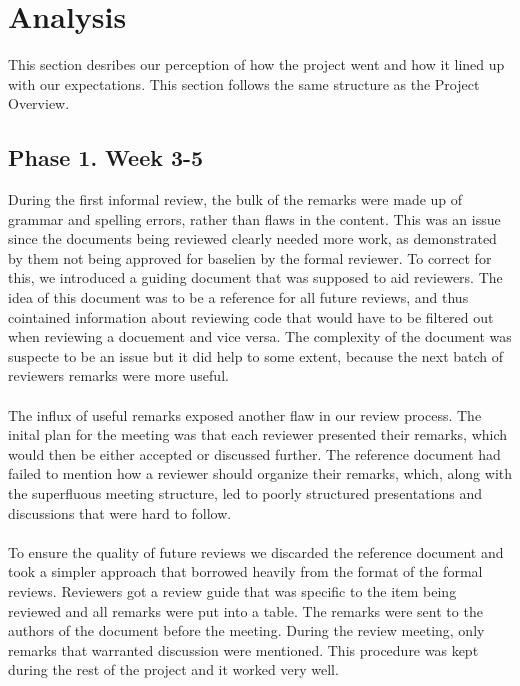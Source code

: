\documentclass{article}
\begin{document}
\section{Analysis \label{analysis}}
    This section desribes our perception of how the project went and how it lined up with our expectations. 
    This section follows the same structure as the Project Overview.

    \subsection{Phase 1. Week 3-5} 
        During the first informal review, the bulk of the remarks were made up of grammar and spelling errors, rather
        than flaws in the  content. This was an issue since the documents being reviewed clearly needed more work, as demonstrated
        by them not being approved for baselien by the formal reviewer. To correct for this, we introduced a guiding document that was
        supposed to aid reviewers. The idea of this document was to be a reference for all future reviews, and 
        thus cointained information about reviewing code that would have to be filtered out when 
        reviewing a docuement and vice versa. The complexity of the document was suspecte to be an issue but it did help to some extent, because the next batch of reviewers remarks were more useful.
        \\ \\
        The influx of useful remarks exposed another flaw in our review process. The inital plan for the meeting was
        that each reviewer presented their remarks, which would then be either accepted or discussed further. 
        The reference document had failed to mention how a reviewer should organize their
        remarks, which, along with the superfluous meeting structure, led to poorly structured presentations and discussions that were hard to follow.
        \\ \\
        To ensure the quality of future reviews we discarded the reference document and took a simpler
        approach that borrowed heavily from the format of the formal reviews. Reviewers got a review 
        guide that was specific to the item being reviewed and all remarks were put into a
        table. The remarks were sent to the authors of the document before the meeting. During the review meeting,
        only remarks that warranted discussion were mentioned. This procedure was kept during the rest of the project and it worked very well.
\end{document}
